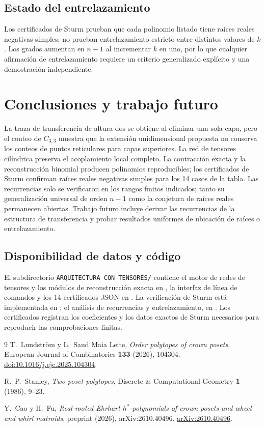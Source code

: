 \documentclass[11pt,a4paper]{article}
\theoremstyle{definition}
\begin{document}
\subsection{Estado del entrelazamiento}

Los certificados de Sturm prueban que cada polinomio listado tiene raíces reales negativas simples; no prueban entrelazamiento estricto entre distintos valores de $k$. Los grados aumentan en $n-1$ al incrementar $k$ en uno, por lo que cualquier afirmación de entrelazamiento requiere un criterio generalizado explícito y una demostración independiente.

\section{Conclusiones y trabajo futuro}

La traza de transferencia de altura dos se obtiene al eliminar una sola capa, pero el conteo de $C_{3,3}$ muestra que la extensión unidimensional propuesta no conserva los conteos de puntos reticulares para capas superiores. La red de tensores cilíndrica preserva el acoplamiento local completo. La contracción exacta y la reconstrucción binomial producen polinomios reproducibles; los certificados de Sturm confirman raíces reales negativas simples para los 14 casos de la tabla. Las recurrencias solo se verificaron en los rangos finitos indicados; tanto su generalización universal de orden $n-1$ como la conjetura de raíces reales permanecen abiertas. Trabajo futuro incluye derivar las recurrencias de la estructura de transferencia y probar resultados uniformes de ubicación de raíces o entrelazamiento.

\subsection{Disponibilidad de datos y código}

El subdirectorio \texttt{ARQUITECTURA CON TENSORES/} contiene el motor
de redes de tensores y los módulos de reconstrucción exacta en ,
la interfaz de línea de comandos  y los 14 certificados JSON
en . La verificación de Sturm está implementada en
; el análisis de recurrencias y entrelazamiento,
en . Los certificados registran los
coeficientes y los datos exactos de Sturm necesarios para reproducir las
comprobaciones finitas.

\begin{thebibliography}{9}
T.~Lundstr\"om y L.~Saud Maia Leite,
\emph{Order polytopes of crown posets},
European Journal of Combinatorics \textbf{133} (2026), 104304.
\href{https://doi.org/10.1016/j.ejc.2025.104304}{doi:10.1016/j.ejc.2025.104304}.

R.~P.~Stanley,
\emph{Two poset polytopes},
Discrete \& Computational Geometry \textbf{1} (1986), 9--23.

Y.~Cao y H.~Fu,
\emph{Real-rooted Ehrhart $h^*$-polynomials of crown posets and wheel and whirl matroids},
preprint (2026), arXiv:2610.40496.
\href{https://arxiv.org/abs/2610.40496}{arXiv:2610.40496}.
\end{thebibliography}
\end{document}
